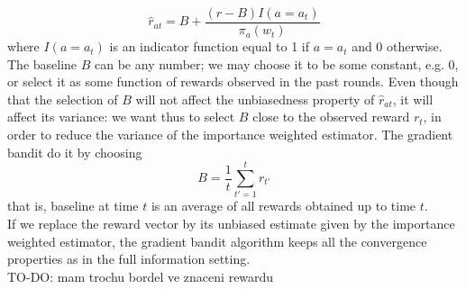 \documentclass{article}
\theoremstyle{remark}
\theoremstyle{definition}
\begin{document}
$$
\hat{r}_{at} = B + \frac{(r - B)I(a=a_t)}{\pi_a(w_t)}
$$ 
where $I(a=a_t)$ is an indicator function equal to 1 if $a=a_t$ and 0 otherwise. \\
The baseline $B$ can be any number; we may choose it to be some constant, e.g. 0, or select it as some function of rewards observed in the past rounds. Even though that the selection of $B$ will not affect the unbiasedness property of $\hat{r}_{at}$, it will affect its variance: we want thus to select $B$ close to the observed reward $r_t$, in order to reduce the variance of the importance weighted estimator. The gradient bandit do it by choosing 
$$
B = \frac{1}{t} \sum_{t'=1}^{t} r_{t'}
$$
that is, baseline at time $t$ is an average of all rewards obtained up to time $t$. \\
If we replace the reward vector by its unbiased estimate given by the importance weighted estimator, the gradient bandit algorithm keeps all the convergence properties as in the full information setting.
\\TO-DO: mam trochu bordel ve znaceni rewardu
\begin{comment}
Mame softmax, ten ma nejaky vahy. V plne informacnim settingu bychom si jeli SGD, samplovali bychom reward vektory, z nich spocitali expected reward, ten zderivovali podle vah a updatnuli. Garance konvergence podle SGD, musime vhodne vanishovat learning step (okolo O(1/t)). \\
Jelikoz nemame celej reward vektor tak ho musime nahradit estimatem, jedinej unbiased estimate v tomhle settingu je improtance weighted estimator (u kteryho si btw muzem vybrat baselinu, vhodne zvolena baselina nam snizuje variance. Jelikoz nas zajimaj jen rozdily mezi rewardama (coz je vlastnost toho ze pocitame derivace, nesouvisi to netne se softmaxem), tak tam muzem dat cokoliv co nezavisi na akci, treba prumer rewardu z minulych akci je fajn. Taky ten improtance weighted estimator muzem udelat trochu biased a tim snizit variance, ktera muze byt dost velka pro akce s nizkou pravdepodobnosti). S tim importance weighted estimatem mame porad garance konvergence jako SGD.
\end{comment}
\end{document}
